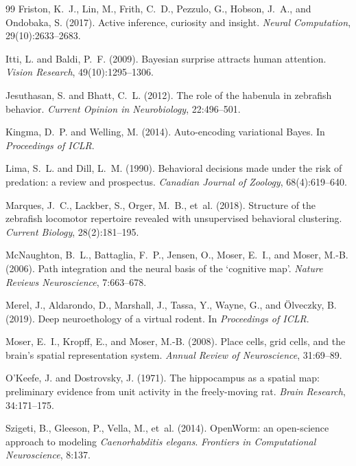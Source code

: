 \documentclass[12pt]{article}
\begin{document}
\begin{thebibliography}{99}
Friston, K.~J., Lin, M., Frith, C.~D., Pezzulo, G., Hobson, J.~A., and Ondobaka, S. (2017).
Active inference, curiosity and insight.
\textit{Neural Computation}, 29(10):2633--2683.

Itti, L. and Baldi, P.~F. (2009).
Bayesian surprise attracts human attention.
\textit{Vision Research}, 49(10):1295--1306.

Jesuthasan, S. and Bhatt, C.~L. (2012).
The role of the habenula in zebrafish behavior.
\textit{Current Opinion in Neurobiology}, 22:496--501.

Kingma, D.~P. and Welling, M. (2014).
Auto-encoding variational {B}ayes.
In \textit{Proceedings of ICLR}.

Lima, S.~L. and Dill, L.~M. (1990).
Behavioral decisions made under the risk of predation: a review and prospectus.
\textit{Canadian Journal of Zoology}, 68(4):619--640.

Marques, J.~C., Lackber, S., Orger, M.~B., et~al. (2018).
Structure of the zebrafish locomotor repertoire revealed with unsupervised behavioral clustering.
\textit{Current Biology}, 28(2):181--195.

McNaughton, B.~L., Battaglia, F.~P., Jensen, O., Moser, E.~I., and Moser, M.-B. (2006).
Path integration and the neural basis of the `cognitive map'.
\textit{Nature Reviews Neuroscience}, 7:663--678.

Merel, J., Aldarondo, D., Marshall, J., Tassa, Y., Wayne, G., and {\"O}lveczky, B. (2019).
Deep neuroethology of a virtual rodent.
In \textit{Proceedings of ICLR}.

Moser, E.~I., Kropff, E., and Moser, M.-B. (2008).
Place cells, grid cells, and the brain's spatial representation system.
\textit{Annual Review of Neuroscience}, 31:69--89.

O'Keefe, J. and Dostrovsky, J. (1971).
The hippocampus as a spatial map: preliminary evidence from unit activity in the freely-moving rat.
\textit{Brain Research}, 34:171--175.

Szigeti, B., Gleeson, P., Vella, M., et~al. (2014).
{OpenWorm}: an open-science approach to modeling \textit{Caenorhabditis elegans}.
\textit{Frontiers in Computational Neuroscience}, 8:137.


\end{thebibliography}
\end{document}
